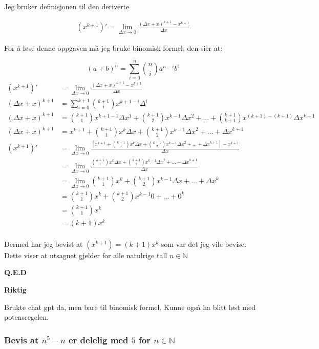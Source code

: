 \documentclass{article}
\begin{document}
Jeg bruker definisjonen til den deriverte

\begin{align*}
    (x^{k+1})'=\lim_{\Delta x \rightarrow 0}\frac{(\Delta x + x)^{k+1}-x^{k+1}}{\Delta x}
\end{align*}

For å løse denne oppgaven må jeg bruke binomisk formel, den sier at:

$$(a+b)^n=\sum_{i=0}^{n}\binom{n}{i}a^{n-i}b^i$$
\begin{align*}
    (x^{k+1})' &= \lim_{\Delta x \rightarrow 0} \frac{(\Delta x + x)^{k+1} - x^{k+1}}{\Delta x} \\
    (\Delta x + x)^{k+1} &= \sum_{i=0}^{k+1}\binom{k+1}{i}x^{k+1-i}\Delta^i \\
    (\Delta x + x)^{k+1} &= \binom{k+1}{1}x^{k+1-1}\Delta x^1+\binom{k+1}{2}x^{k-1}\Delta x^2+...+\binom{k+1}{k+1}x^{(k+1)-(k+1)} \Delta x ^{k+1} \\
    (\Delta x + x)^{k+1} &= x^{k+1}+\binom{k+1}{1}x^k\Delta x + \binom{k+1}{2}x^{k-1}{\Delta x} ^2+...+{\Delta x}^{k+1} \\
    (x^{k+1})' &= \lim_{\Delta x \rightarrow 0} \frac{[x^{k+1}+\binom{k+1}{1}x^k\Delta x + \binom{k+1}{2}x^{k-1}{\Delta x} ^2+...+{\Delta x}^{k+1}] - x^{k+1}}{\Delta x} \\
    &= \lim_{\Delta x \rightarrow 0} \frac{\binom{k+1}{1}x^k\Delta x + \binom{k+1}{2}x^{k-1}{\Delta x} ^2+...+{\Delta x}^{k+1}}{\Delta x} \\
    &= \lim_{\Delta x \rightarrow 0} \binom{k+1}{1}x^k + \binom{k+1}{2} x^{k-1} \Delta x + ... + {\Delta x}^k \\
    &= \binom{k+1}{1}x^k+\binom{k+1}{2}x^{k-1}0+...+0^k \\
    &= \binom{k+1}{1}x^k \\
    &= (k+1)x^k \\
\end{align*}

Dermed har jeg bevist at $(x^{k+1})=(k+1)x^k$ som var det jeg vile bevise. Dette viser at utsagnet gjelder for alle natulrige tall $n \in \mathbb{N}$

\textbf{Q.E.D}

\textbf{Riktig}

Brukte chat gpt da, men bare til binomisk formel. Kunne også ha blitt løst med potensregelen.

\newpage

\subsubsection{Bevis at $n^5-n$ er delelig med $5$ for $n \in \mathbb{N}$}
\end{document}
